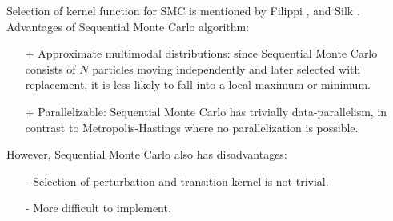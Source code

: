 Selection of kernel function for SMC is mentioned by Filippi \cite{filippi2013optimality}, and Silk \cite{silk2012optimizing}.\\
Advantages of Sequential Monte Carlo algorithm:
\begin{itemize}
    \item[+] Approximate multimodal distributions: since Sequential Monte Carlo consists of $N$
          particles moving independently and later selected with replacement, it is less likely to fall
          into a local maximum or minimum.
    \item[+] Parallelizable: Sequential Monte Carlo has trivially data-parallelism, in contrast to
          Metropolis-Hastings where no parallelization is possible.
\end{itemize}
However, Sequential Monte Carlo also has disadvantages:
\begin{itemize}
    \item[-] Selection of perturbation and transition kernel is not trivial.
    \item[-] More difficult to implement.
\end{itemize}

